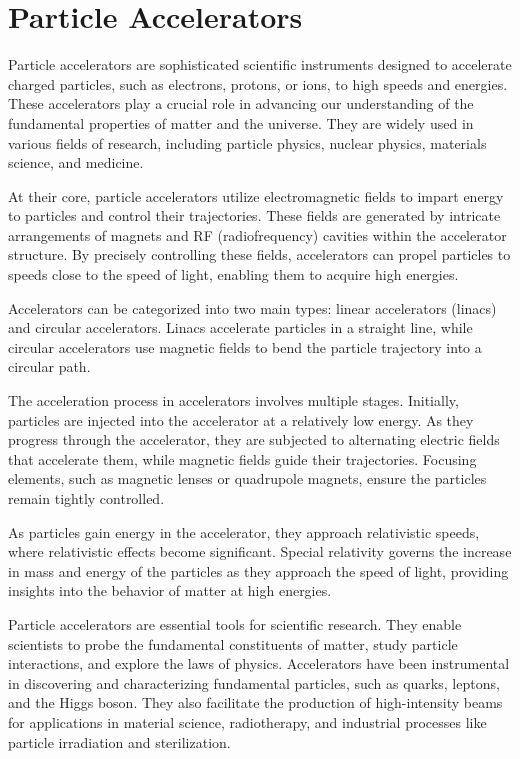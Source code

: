 \documentclass[a4paper,oneside,12pt]{report}
\numberwithin{equation}{chapter}
\begin{document}
\newpage



\section{Particle Accelerators}

Particle accelerators are sophisticated scientific instruments designed to accelerate charged particles, such as electrons, protons, or ions, to high speeds and energies. 
These accelerators play a crucial role in advancing our understanding of the fundamental properties of matter and the universe. 
They are widely used in various fields of research, including particle physics, nuclear physics, materials science, and medicine.

At their core, particle accelerators utilize electromagnetic fields to impart energy to particles and control their trajectories. 
These fields are generated by intricate arrangements of magnets and RF (radiofrequency) cavities within the accelerator structure. 
By precisely controlling these fields, accelerators can propel particles to speeds close to the speed of light, enabling them to acquire high energies.

Accelerators can be categorized into two main types: linear accelerators (linacs) and circular accelerators. 
Linacs accelerate particles in a straight line, while circular accelerators use magnetic fields to bend the particle trajectory into a circular path. 

The acceleration process in accelerators involves multiple stages. Initially, particles are injected into the accelerator at a relatively low energy. 
As they progress through the accelerator, they are subjected to alternating electric fields that accelerate them, while magnetic fields guide their trajectories.
Focusing elements, such as magnetic lenses or quadrupole magnets, ensure the particles remain tightly controlled.

As particles gain energy in the accelerator, they approach relativistic speeds, where relativistic effects become significant. 
Special relativity governs the increase in mass and energy of the particles as they approach the speed of light, providing insights into the behavior of matter at high energies.

Particle accelerators are essential tools for scientific research. They enable scientists to probe the fundamental constituents of matter, study particle interactions, and explore the laws of physics. 
Accelerators have been instrumental in discovering and characterizing fundamental particles, such as quarks, leptons, and the Higgs boson. 
They also facilitate the production of high-intensity beams for applications in material science, radiotherapy, and industrial processes like particle irradiation and sterilization.
\end{document}
